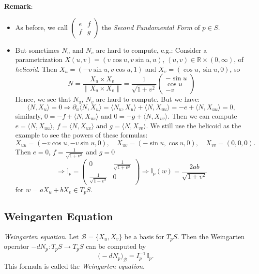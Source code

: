 \noindent\textbf{Remark}: 
\begin{itemize}
\item As before, we call $\begin{pmatrix}e & f\\ f & g\end{pmatrix}$ the \textit{Second Fundamental Form} of $p\in S$.
\item But sometimes $N_u$ and $N_v$ are hard to compute, e.g.: Consider a parametrization $X(u, v) = (v\cos u, v\sin u, u)$, $(u, v)\in\mathbb{R}\times(0, \infty)$, of \textit{helicoid}. Then $X_u = (-v\sin u, v\cos u, 1)$ and $X_v = (\cos u, \sin u, 0)$, so
\[
N = \frac{X_u\times X_v}{\|X_u\times X_v\|} = \frac{1}{\sqrt{1 + v^2}}\begin{pmatrix}-\sin u\\ \cos u\\ -v\end{pmatrix}
\]
Hence, we see that $N_u$, $N_v$ are hard to compute. But we have:
\[
\big\langle N, X_u\big\rangle = 0 \Rightarrow \partial_u\big\langle N, X_u\big\rangle = \big\langle N_u, X_u\big\rangle + \big\langle N, X_{uu}\big\rangle = -e + \big\langle N, X_{uu}\big\rangle = 0,
\]
similarly, $0 = -f + \big\langle N, X_{uv}\big\rangle$ and $0 = -g + \big\langle N, X_{vv}\big\rangle$. Then we can compute $e = \big\langle N, X_{uu}\big\rangle$, $f = \big\langle N, X_{uv}\big\rangle$ and $g = \big\langle N, X_{vv}\big\rangle$. We still use the helicoid as the example to see the powers of these formulas:
\[
X_{uu} = (-v\cos u, -v\sin u, 0), \quad X_{uv} = (-\sin u, \cos u, 0), \quad X_{vv} = (0, 0, 0).
\]
Then $e = 0$, $f = \frac{1}{\sqrt{1 + v^2}}$ and $g = 0$
\[
\Rightarrow \mathbb{I}_p = \begin{pmatrix}0 & \frac{1}{\sqrt{1 + v^2}}\\[2mm] \frac{1}{\sqrt{1 + v^2}} & 0\end{pmatrix} \Rightarrow \mathbb{I}_p(w) = \frac{2ab}{\sqrt{1 + v^2}}
\]
for $w = aX_u + bX_v\in T_pS$.
\end{itemize}

\subsection{Weingarten Equation}

\begin{theorem}
\textit{Weingarten equation}. Let $\mathcal{B} = \{X_u, X_v\}$ be a basis for $T_pS$. Then the Weingarten operator $-dN_p: T_pS\to T_pS$ can be computed by
\[
\big(-dN_p\big)_\mathcal{B} = I_p^{-1}\,\mathbb{I}_p.
\]
This formula is called the \textit{Weingarten equation}.
\end{theorem}

